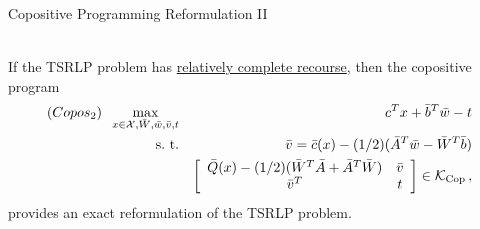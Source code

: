 \documentclass[xcolor=x11names,compress]{beamer}
\renewcommand{\(}{\begin{columns}}
\renewcommand{\)}{\end{columns}}
\newcommand{\<}[1]{\begin{column}{#1}}
\renewcommand{\>}{\end{column}}
\def\subto{{\rm s. \mbox{ }\rm t.}}
\def\min{\mathop{\rm min}}
\def\max{\mathop{\rm max}}
\newcommand{\0}{\V{0}}
\newcommand{\1}{\V{1}}
\newcommand{\mymbox}[1]{\mbox{\scriptsize #1}}
\renewcommand{\Re}{\mathbb{R}}
\newcommand{\eye}{{I}} %
\newcommand{\ttQ}{\bar{Q}(x)}
\newcommand{\ttq}{\bar{c}(x)}
\newcommand{\ttA}{\bar{A}}
\newcommand{\ttb}{\bar{b}}
\newcommand{\tty}{\bar{y}}
\newcommand{\ttw}{\bar{w}}
\newcommand{\ttv}{\bar{v}}
\newcommand{\ttW}{\bar{W}}
\newcommand{\copconeCopos}{\mathcal{K}_{\mymbox{Cop}}}
\begin{document}

\begin{frame}{Copositive Programming Reformulation II}
\begin{theorem}
\vspace{-0.5cm}\hspace{2.5cm}{\footnotesize [revised AJ\&D (2016b)]}\\
 If the TSRLP problem has \underline{relatively complete recourse}, then the copositive program
\begin{eqnarray*}
(Copos_2)\;\;\max_{x\in\mathcal{X},\ttW,\ttw,\ttv,t} && c^T x+ \ttb^T\ttw - t\\
\subto && \ttv = \ttq - (1/2)(\ttA^T\ttw-\ttW^T\ttb)\\
&&\left[\begin{array}{cc} \ttQ - (1/2)(\ttW^T \ttA + \ttA^T\ttW) & \ttv\\ \ttv^T & t\end{array}\right]\in \copconeCopos\,,
\end{eqnarray*}
provides an exact reformulation of the TSRLP problem.
\end{theorem}

\end{frame}
\end{document}
